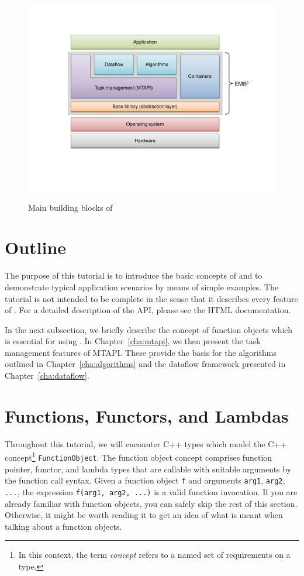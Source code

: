 \begin{figure}[H]
  \centering
  \includegraphics[width=0.75\columnwidth]{../images/embb.pdf}
  \label{fig:embb_components}
  \caption{Main building blocks of \embb}
  \label{fig:introduction_embb_components}
\end{figure}


\section{Outline}

The purpose of this tutorial is to introduce the basic concepts of \embb and to demonstrate typical application scenarios by means of simple examples. The tutorial is not intended to be complete in the sense that it describes every feature of \embb. For a detailed description of the API, please see the HTML documentation.

In the next subsection, we briefly describe the concept of function objects which is essential for using \embb. In Chapter~\ref{cha:mtapi}, we then present the task management features of MTAPI. These provide the basis for the algorithms outlined in Chapter~\ref{cha:algorithms} and the dataflow framework presented in Chapter~\ref{cha:dataflow}.

\section{Functions, Functors, and Lambdas}
\label{sec:introduction_function_objects}

Throughout this tutorial, we will encounter C++ types which model the C++ concept\footnote{In this context, the term \emph{concept} refers to a named set of requirements on a type.} \lstinline|FunctionObject|. The function object concept comprises function pointer, functor, and lambda types that are callable with suitable arguments by the function call syntax. Given a function object \lstinline|f| and arguments \lstinline|arg1|, \lstinline|arg2|, \lstinline|...|, the expression \lstinline|f(arg1, arg2, ...)| is a valid function invocation. If you are already familiar with function objects, you can safely skip the rest of this section. Otherwise, it might be worth reading it to get an idea of what is meant when talking about a function objects.

